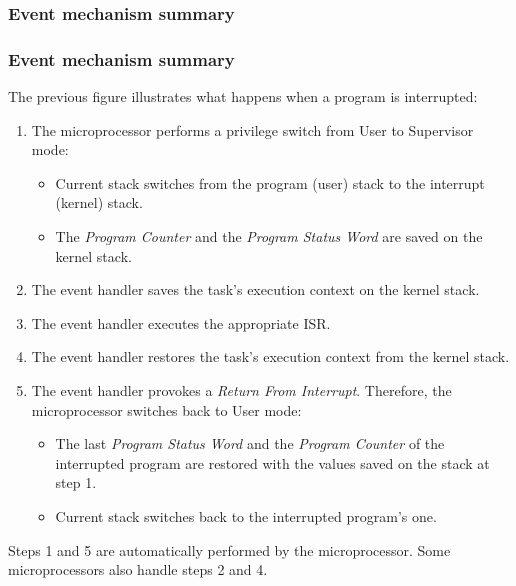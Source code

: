 %
%
%

\begin{frame}
  \frametitle{Event mechanism summary}


\end{frame}

%
%
%

\begin{frame}
  \frametitle{Event mechanism summary}

  The previous figure illustrates what happens when a program is interrupted:

  \-

  \begin{enumerate}
    \item The microprocessor performs a privilege switch from User to Supervisor
      mode:
      \begin{itemize}
        \item Current stack switches from the program (user) stack to the
	  interrupt (kernel) stack.
        \item The {\em Program Counter} and the {\em Program Status Word} are
	 saved on the kernel stack.
      \end{itemize}
    \item The event handler saves the task's execution context on the kernel
      stack.
    \item The event handler executes the appropriate ISR.
    \item The event handler restores the task's execution context from the
      kernel stack.
    \item The event handler provokes a {\em Return From Interrupt}. Therefore,
      the microprocessor switches back to User mode:
    \begin{itemize}
      \item The last {\em Program Status Word} and the {\em Program Counter}
        of the interrupted program are restored with the values saved on the
	stack at step 1.
      \item Current stack switches back to the interrupted program's one.
    \end{itemize}
  \end{enumerate}

  \-

  Steps 1 and 5 are automatically performed by the microprocessor. Some
  microprocessors also handle steps 2 and 4.

\end{frame}

